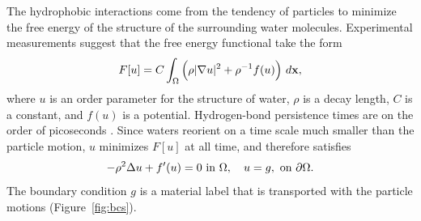 The hydrophobic interactions come from the tendency of particles to
minimize the free energy of the structure of the surrounding water
molecules. Experimental measurements suggest that the free energy
functional take the form 
\begin{align*}
\label{eq:free_energy}
  F[u] = C \int_{\Omega} \left(\rho |\nabla u|^2 + \rho^{-1} f(u)\right)
  \,d\mathbf{x},
\end{align*}
where $u$ is an order parameter for the structure of water, $\rho$ is a
decay length, $C$ is a constant, and $f(u)$ is a potential.
Hydrogen-bond persistence times are on the order of picoseconds
\cite{MaGa13}. Since waters reorient on a time scale much smaller than
the particle motion, $u$ minimizes $F[u]$ at all time, and therefore
satisfies 
\begin{equation}
\label{eq:SL}
-\rho^2 \Delta u + f'(u) = 0  \text{ in } \Omega,\quad u = g,
\text{ on } \partial\Omega.
\end{equation}
The boundary condition $g$ is a material label that is transported with
the particle motions (Figure~\ref{fig:bcs}).

